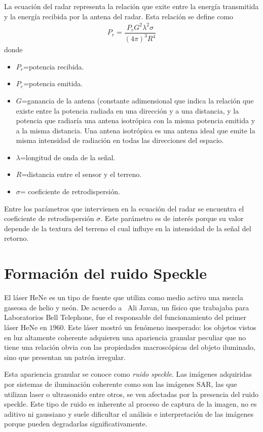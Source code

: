 La ecuación del radar representa la relación que exite entre la energía transmitida y la energía recibida por la antena del radar. Esta relación se define como
\begin{align}
P_r=\dfrac{P_e G^2 \lambda^2 \sigma}{(4 \pi)^3 R^4} 
\end{align}
donde
\begin{itemize}
	\item $P_r$=potencia recibida.
	\item $P_e$=potencia emitida.
	\item $G$=ganancia de la antena (constante adimensional que indica la relación que existe entre la potencia radiada en una dirección y a una distancia, y la  potencia que radiaría una antena isotrópica con la misma potencia emitida y a la misma distancia. Una antena isotrópica es una antena ideal que emite la misma intensidad de radiación en todas las direcciones del espacio.
	\item $\lambda$=longitud de onda de la señal.
	\item $R$=distancia entre el sensor y el terreno.
	\item $\sigma$= coeficiente de retrodispersión.
\end{itemize}

Entre los parámetros que intervienen en la ecuación del radar se encuentra el coeficiente de retrodispersión $\sigma$. Este parámetro es de interés porque su valor depende de la textura del terreno el cual influye en la intensidad de la señal del retorno.

\section{Formación del ruido Speckle}
\label{FormacionSpeckle}

El láser HeNe es un tipo de fuente que utiliza como medio activo una mezcla gaseosa de helio y neón. De acuerdo a~\cite{Goodman1975,Quel1994} Ali Javan, un físico que trabajaba para Laboratorios Bell Telephone, fue el responsable del funcionamiento del primer láser HeNe en $1960$. Este láser  mostró un fenómeno inesperado: los objetos vistos en luz altamente coherente adquieren una apariencia granular peculiar que no tiene una relación obvia con las propiedades macroscópicas del objeto iluminado, sino que presentan un patrón irregular. 

Esta apariencia granular se conoce como \textit{ruido speckle}. Las imágenes adquiridas por sistemas de iluminación coherente como son las imágenes SAR, las que utilizan laser o ultrasonido entre otros, se ven afectadas por la presencia del ruido speckle. Este tipo de ruido es inherente al proceso de captura de la imagen, no es aditivo ni gaussiano y suele dificultar el análisis e interpretación de las imágenes porque pueden degradarlas significativamente.


